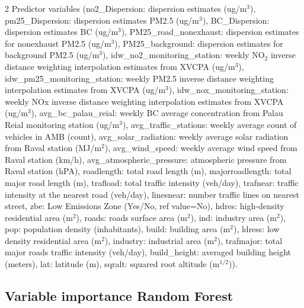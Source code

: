 \documentclass{article}
\begin{document}
\begin{samepage}
\begin{table}[!htbp]
\begin{threeparttable}
\begin{tablenotes}
\item [2] Predictor variables (no2\_Dispersion: dispersion estimates (ug/m$^3$), pm25\_Dispersion: dispersion estimates PM2.5 (ug/m$^3$), BC\_Dispersion: dispersion estimates BC (ug/m$^3$), PM25\_road\_nonexhaust: dispersion estimates for nonexhaust PM2.5 (ug/m$^3$), PM25\_background: dispersion estimates for background PM2.5 (ug/m$^3$), idw\_no2\_monitoring\_station: weekly NO$_2$ inverse distance weighting interpolation estimates from XVCPA (ug/m$^3$), idw\_pm25\_monitoring\_station: weekly PM2.5 inverse distance weighting interpolation estimates from XVCPA (ug/m$^3$), idw\_nox\_monitoring\_station: weekly NOx inverse distance weighting interpolation estimates from XVCPA (ug/m$^3$), avg\_bc\_palau\_reial: weekly BC average concentration from Palau Reial monitoring station (ug/m$^3$), avg\_traffic\_stations: weekly average count of vehicles in AMB (count), avg\_solar\_radiation: weekly average solar radiation from Raval station (MJ/m$^2$), avg\_wind\_speed: weekly average wind speed from Raval station (km/h), avg\_atmospheric\_pressure: atmospheric pressure from Raval station (hPA), roadlength: total road length (m), majorroadlength: total major road length (m), trafload: total traffic intensity (veh/day), trafnear: traffic intensity at the nearest road (veh/day), linesnear: number traffic lines on nearest street, zbe: Low Emissions Zone (Yes/No, ref value=No), hdres: high-density residential area (m$^2$), roads: roads surface area (m$^2$), ind: industry area (m$^2$), pop: population density (inhabitants), build: building area (m$^2$), ldress: low density residential area (m$^2$), industry: industrial area (m$^2$), trafmajor: total major roads traffic intensity (veh/day), build\_height: averaged building height (meters), lat: latitude (m), sqralt: squared root altitude (m$^{1/2}$)).
\end{tablenotes}
\label{tablesX}
\end{threeparttable}
\end{table}
\end{samepage}
\clearpage



\newpage
\subsection{Variable importance Random Forest}
\end{document}
